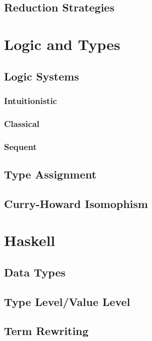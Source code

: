 \subsection{Reduction Strategies}

  \section{Logic and Types}
  \subsection{Logic Systems}
  \subsubsection{Intuitionistic}
  \subsubsection{Classical}
  \subsubsection{Sequent}

  \subsection{Type Assignment}

  \subsection{Curry-Howard Isomophism}

\section{Haskell}
  \subsection{Data Types}
  \subsection{Type Level/Value Level}
  \subsection{Term Rewriting}

